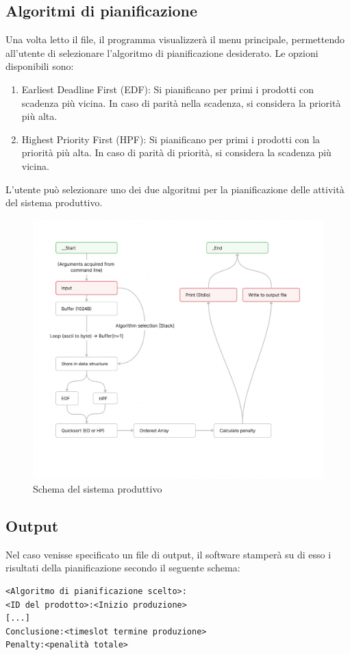 \documentclass[a4paper]{report}
\begin{document}
\subsection{Algoritmi di pianificazione}
Una volta letto il file, il programma visualizzerà il menu principale, permettendo all'utente di selezionare l'algoritmo di pianificazione desiderato. Le opzioni disponibili sono:

\begin{enumerate}
  \item Earliest Deadline First (EDF): Si pianificano per primi i prodotti con scadenza più vicina. In caso di parità nella scadenza, si considera la priorità più alta.
  \item Highest Priority First (HPF): Si pianificano per primi i prodotti con la priorità più alta. In caso di parità di priorità, si considera la scadenza più vicina.
\end{enumerate}

L'utente può selezionare uno dei due algoritmi per la pianificazione delle attività del sistema produttivo.

\begin{figure}[H]
  \centering
  \includegraphics[width=\textwidth]{schema.png}
  \caption{Schema del sistema produttivo}
  \label{fig:schema}
\end{figure}

\subsection{Output}
Nel caso venisse specificato un file di output, il software stamperà su di esso i risultati della pianificazione secondo il seguente schema:
\begin{verbatim}
<Algoritmo di pianificazione scelto>:
<ID del prodotto>:<Inizio produzione>
[...]
Conclusione:<timeslot termine produzione>
Penalty:<penalità totale>
\end{verbatim}
\end{document}
